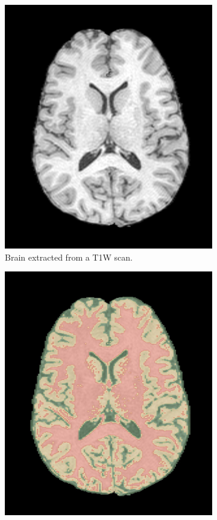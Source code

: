 \documentclass{standalone}
\begin{document}
\begin{figure}[h!]
		\centering
        \begin{subfigure}[b]{0.495\textwidth}
             \includegraphics[scale=0.15]{img/Chap2/brain2.jpg}
             \caption{Brain extracted from a T1W scan.}
        \end{subfigure}
        \hfill
        \begin{subfigure}[b]{0.495\textwidth}
             \includegraphics[scale=0.15]{img/Chap2/segmented_axial.jpg}

\end{subfigure}
\end{figure}
\end{document}
